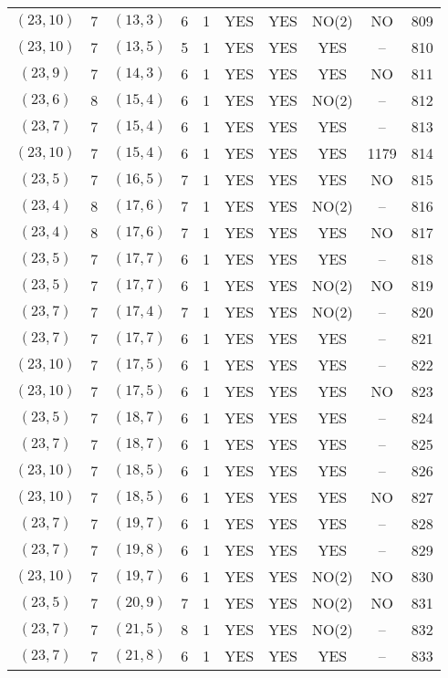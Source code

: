 \begin{longtable}{|c|c|c|c|c|c|c|c|c|c|}
$(23, 10)$ & 7 & $(13, 3)$ & 6 & 1 & YES & YES & NO(2) & NO & 809\\
$(23, 10)$ & 7 & $(13, 5)$ & 5 & 1 & YES & YES & YES & -- & 810\\
$(23, 9)$ & 7 & $(14, 3)$ & 6 & 1 & YES & YES & YES & NO & 811\\
$(23, 6)$ & 8 & $(15, 4)$ & 6 & 1 & YES & YES & NO(2) & -- & 812\\
$(23, 7)$ & 7 & $(15, 4)$ & 6 & 1 & YES & YES & YES & -- & 813\\
$(23, 10)$ & 7 & $(15, 4)$ & 6 & 1 & YES & YES & YES & 1179 & 814\\
$(23, 5)$ & 7 & $(16, 5)$ & 7 & 1 & YES & YES & YES & NO & 815\\
$(23, 4)$ & 8 & $(17, 6)$ & 7 & 1 & YES & YES & NO(2) & -- & 816\\
$(23, 4)$ & 8 & $(17, 6)$ & 7 & 1 & YES & YES & YES & NO & 817\\
$(23, 5)$ & 7 & $(17, 7)$ & 6 & 1 & YES & YES & YES & -- & 818\\
$(23, 5)$ & 7 & $(17, 7)$ & 6 & 1 & YES & YES & NO(2) & NO & 819\\
$(23, 7)$ & 7 & $(17, 4)$ & 7 & 1 & YES & YES & NO(2) & -- & 820\\
$(23, 7)$ & 7 & $(17, 7)$ & 6 & 1 & YES & YES & YES & -- & 821\\
$(23, 10)$ & 7 & $(17, 5)$ & 6 & 1 & YES & YES & YES & -- & 822\\
$(23, 10)$ & 7 & $(17, 5)$ & 6 & 1 & YES & YES & YES & NO & 823\\
$(23, 5)$ & 7 & $(18, 7)$ & 6 & 1 & YES & YES & YES & -- & 824\\
$(23, 7)$ & 7 & $(18, 7)$ & 6 & 1 & YES & YES & YES & -- & 825\\
$(23, 10)$ & 7 & $(18, 5)$ & 6 & 1 & YES & YES & YES & -- & 826\\
$(23, 10)$ & 7 & $(18, 5)$ & 6 & 1 & YES & YES & YES & NO & 827\\
$(23, 7)$ & 7 & $(19, 7)$ & 6 & 1 & YES & YES & YES & -- & 828\\
$(23, 7)$ & 7 & $(19, 8)$ & 6 & 1 & YES & YES & YES & -- & 829\\
$(23, 10)$ & 7 & $(19, 7)$ & 6 & 1 & YES & YES & NO(2) & NO & 830\\
$(23, 5)$ & 7 & $(20, 9)$ & 7 & 1 & YES & YES & NO(2) & NO & 831\\
$(23, 7)$ & 7 & $(21, 5)$ & 8 & 1 & YES & YES & NO(2) & -- & 832\\
$(23, 7)$ & 7 & $(21, 8)$ & 6 & 1 & YES & YES & YES & -- & 833\\

\end{longtable}
